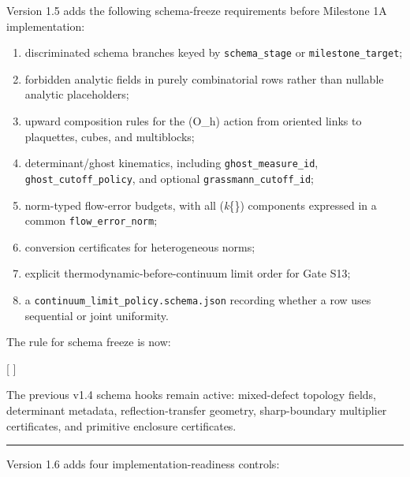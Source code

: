 \documentclass[
]{article}
\providecommand{\tightlist}{%
  \setlength{\itemsep}{0pt}\setlength{\parskip}{0pt}}
\begin{document}
Version 1.5 adds the following schema-freeze requirements before
Milestone 1A implementation:

\begin{enumerate}
\def\labelenumi{\arabic{enumi}.}
\tightlist
\item
  discriminated schema branches keyed by \texttt{schema\_stage} or
  \texttt{milestone\_target};
\item
  forbidden analytic fields in purely combinatorial rows rather than
  nullable analytic placeholders;
\item
  upward composition rules for the (O\_h) action from oriented links to
  plaquettes, cubes, and multiblocks;
\item
  determinant/ghost kinematics, including \texttt{ghost\_measure\_id},
  \texttt{ghost\_cutoff\_policy}, and optional
  \texttt{grassmann\_cutoff\_id};
\item
  norm-typed flow-error budgets, with all
  (\textbar{}\Delta\emph{k\textbar{}}\{\max\}) components expressed in a
  common \texttt{flow\_error\_norm};
\item
  conversion certificates for heterogeneous norms;
\item
  explicit thermodynamic-before-continuum limit order for Gate S13;
\item
  a \texttt{continuum\_limit\_policy.schema.json} recording whether a
  row uses sequential or joint uniformity.
\end{enumerate}

The rule for schema freeze is now:

{[}  \qquad
{} {]}

The previous v1.4 schema hooks remain active: mixed-defect topology
fields, determinant metadata, reflection-transfer geometry,
sharp-boundary multiplier certificates, and primitive enclosure
certificates.

\begin{center}\rule{0.5\linewidth}{0.5pt}\end{center}

Version 1.6 adds four implementation-readiness controls:
\end{document}
